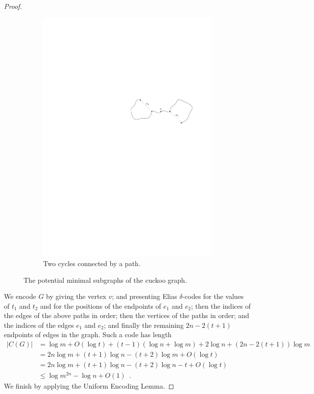 \documentclass[prodmode,acmcsur]{acmsmall}
\begin{document}
\begin{proof}
\begin{figure}
\begin{subfigure}[b]{0.6\textwidth}
      \includegraphics{cuckoo2}
      \caption{Two cycles connected by a path.}
    \end{subfigure}
    \caption{The potential minimal subgraphs of the cuckoo graph.}
  \end{figure}

  We encode $G$ by giving the vertex $v$; and presenting Elias
  $\delta$-codes for the values of $t_1$ and $t_2$ and for the
  positions of the endpoints of $e_1$ and $e_2$; then the indices
  of the edges of
  the above paths in order; then the vertices of the paths in order;
  and the indices of the edges $e_1$ and $e_2$; and finally the 
  remaining $2n - 2(t +
  1)$ endpoints of edges in the graph. Such a code has length
  \begin{align*}
    |C(G)| &= \log m + O(\log t) + (t - 1)(\log n + \log m) + 2\log n + (2n - 2(t + 1))\log m \\
           &= 2n \log m + (t + 1) \log n - (t + 2) \log m + O(\log t) \\
           &= 2n \log m + (t + 1) \log n - (t + 2) \log n - t + O(\log t) \tag{since $m = 2n$} \\
           &\le \log m^{2n} - \log n + O(1) \enspace .
  \end{align*}
  We finish by applying the Uniform Encoding Lemma.
\end{proof}
\end{document}
